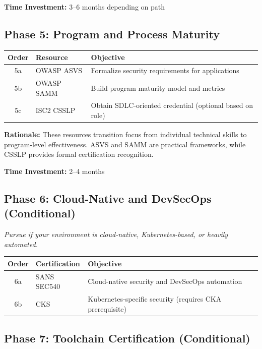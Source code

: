 \documentclass[11pt,letterpaper]{article}
\begin{document}
\textbf{Time Investment:} 3--6 months depending on path

\subsection{Phase 5: Program and Process Maturity}

\begin{table}[H]
\centering
\begin{tabularx}{\textwidth}{c l X}
\toprule
\textbf{Order} & \textbf{Resource} & \textbf{Objective} \\
\midrule
5a & OWASP ASVS & Formalize security requirements for applications \\
\midrule
5b & OWASP SAMM & Build program maturity model and metrics \\
\midrule
5c & ISC2 CSSLP & Obtain SDLC-oriented credential (optional based on role) \\
\bottomrule
\end{tabularx}
\end{table}

\textbf{Rationale:} These resources transition focus from individual technical skills to program-level effectiveness. ASVS and SAMM are practical frameworks, while CSSLP provides formal certification recognition.

\textbf{Time Investment:} 2--4 months

\subsection{Phase 6: Cloud-Native and DevSecOps (Conditional)}

\textit{Pursue if your environment is cloud-native, Kubernetes-based, or heavily automated.}

\begin{table}[H]
\centering
\begin{tabularx}{\textwidth}{c l X}
\toprule
\textbf{Order} & \textbf{Certification} & \textbf{Objective} \\
\midrule
6a & SANS SEC540 & Cloud-native security and DevSecOps automation \\
\midrule
6b & CKS & Kubernetes-specific security (requires CKA prerequisite) \\
\bottomrule
\end{tabularx}
\end{table}

\subsection{Phase 7: Toolchain Certification (Conditional)}
\end{document}

